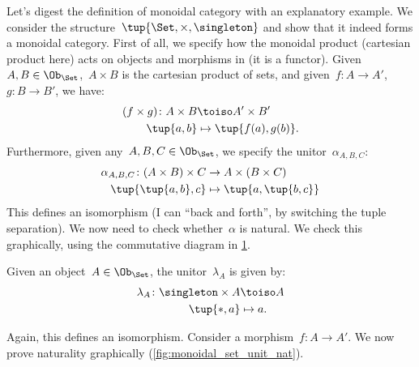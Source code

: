 \begin{example}
  Let's digest the definition of monoidal category with an explanatory example. We consider the structure~$\tup{\Set,\times,\singleton}$ and show that it indeed forms a monoidal category. First of all, we specify how the monoidal product (cartesian product here) acts on objects and morphisms in \Set (it is a functor). Given~$A,B\in \Ob_{\Set}$,~$A\times B$ is the cartesian product of sets, and given~$f\colon A\to A'$,~$g\colon B\to B'$, we have:
  \begin{equation*}
    \begin{aligned}
    (f\times g)
      \colon A\times B&\toiso A'\times B'\\
      \tup{a,b}&\mapsto \tup{f(a),g(b)}.
    \end{aligned}
  \end{equation*}
  Furthermore, given any~$A,B,C\in \Ob_{\Set}$, we specify the unitor~$\alpha_{A,B,C}$:
  \begin{equation*}
    \begin{aligned}
      \alpha_{A,B,C}\colon (A\times B)\times C&\to A\times (B\times C)\\
      \tup{\tup{a,b},c}&\mapsto \tup{a,\tup{b,c}}
    \end{aligned}
  \end{equation*}
  This defines an isomorphism (I can ``back and forth'', by switching the tuple separation). We now need to check whether~$\alpha$ is natural. We check this graphically, using the commutative diagram in \cref{fig:monoidal_set_ass_nat}.

  \begin{figure}[h!]
    \begin{center}
    \end{center}
    \caption{\label{fig:monoidal_set_ass_nat}}
  \end{figure}

  Given an object~$A\in \Ob_\Set$, the unitor~$\lambda_A$ is given by:
  \begin{equation*}
    \begin{aligned}
      \lambda_A\colon \singleton \times A &\toiso A\\
      \tup{\ast,a}&\mapsto a.
    \end{aligned}
  \end{equation*}

  Again, this defines an isomorphism. Consider a morphism~$f\colon A\to A'$. We now prove naturality graphically (\cref{fig:monoidal_set_unit_nat}).


\end{example}
